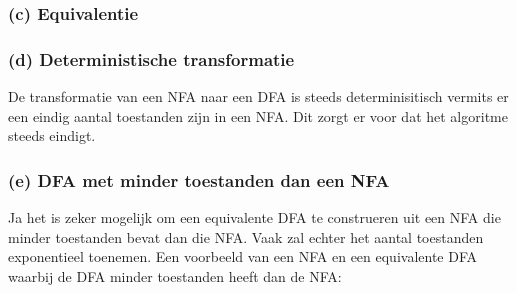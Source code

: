 \subsubsection*{(c) Equivalentie} 
\subsubsection*{(d) Deterministische transformatie}
De transformatie van een NFA naar een DFA is steeds determinisitisch vermits er een eindig aantal toestanden zijn in een NFA. Dit zorgt er voor dat het algoritme steeds eindigt. 
\subsubsection*{(e) DFA met minder toestanden dan een NFA}
Ja het is zeker mogelijk om een equivalente DFA te construeren uit een NFA die minder toestanden bevat dan die NFA. Vaak zal echter het aantal toestanden exponentieel toenemen. 
Een voorbeeld van een NFA en een equivalente DFA waarbij de DFA minder toestanden heeft dan de NFA: 